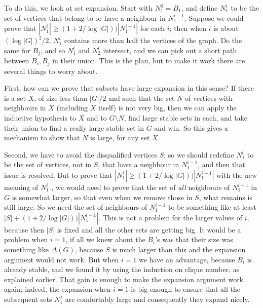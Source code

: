 \documentclass[titlepage,11pt]{article}
\begin{document}
To do this, we look at set expansion. Start with $N_1^0 = B_1$, and define $N_1^i$ to be the set of vertices that belong to or have 
a neighbour in $N_1^{i-1}$.
Suppose we could prove that $|N_1^i|\ge (1+2/\log |G|))|N_1^{i-1}|$ for each $i$; then when $i$ is about $(\log |G|)^2/2$, $N_1^i$
contains more than half the vertices of the graph. Do the same for $B_j$, and so $N_1^i$ and $N_2^i$ intersect, and we can pick out 
a short path between $B_i, B_j$ in their union. This is the plan, but to make it work there are several things to worry about. 

First, how can we prove that subsets have large expansion in this sense? 
If there is a set $X$, of size less than $|G|/2$ and
such that the set $N$ of vertices with neighbours in $X$ (including $X$ itself) is not very big, then we can apply
the inductive hypothesis to $X$ and to $G\setminus N$, find large stable sets in each, and take their union to find a really large 
stable set in $G$ and win. So this gives a mechanism to show that $N$ is large, for any set $X$. 

Second, we have to avoid
the disqualified vertices $S$; so we should redefine $N_1^i$ to be the set of vertices, not in $S$, that have a neighbour in 
$N_1^{i-1}$, and then that issue is resolved. But to prove that $|N_1^i|\ge (1+2/\log |G|))|N_1^{i-1}|$ with the new meaning of $N_1^i$
, we would need to prove that the 
set of {\em all} neighbours of $N_1^{i-1}$ in $G$ is somewhat larger, so that even when we remove those in $S$, what remains is still large.
So we need the set of neighbours of $N_1^{i-1}$ to be something like at least $|S|+(1+2/\log |G|))|N_1^{i-1}|$. This is not a problem for the larger values of $i$,
because then $|S|$ is fixed and all the other sets are getting big. It would be a problem when $i=1$, if all we knew about the $B_i$'s
was that their size was something like $\Delta(G)$, because $S$ is much larger than this and the expansion argument would not work.  
But when $i=1$ we have an advantage,
because $B_i$ is already stable, and we found it by using the induction on clique number, as explained earlier. That gain is 
enough to make the expansion argument work again; indeed, the expansion when $i=1$ is big enough to ensure that all the subsequent
sets $N^j_1$ are comfortably large and consequently they expand nicely.
\end{document}
